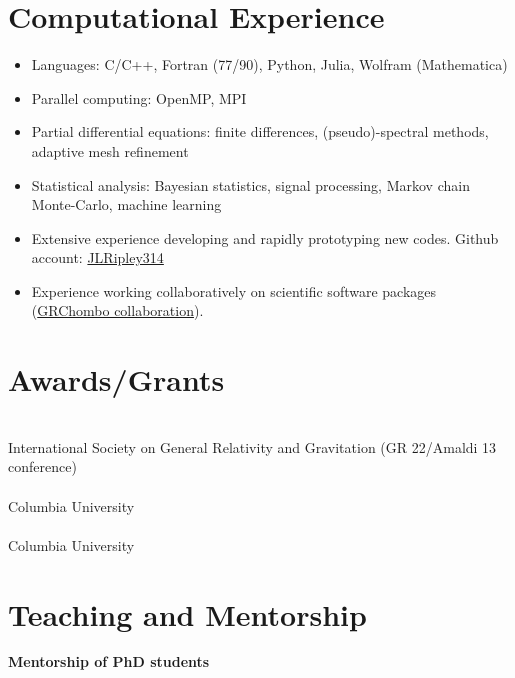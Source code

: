 \documentclass{my_cv}
\begin{document}
\section{Computational Experience}
\begin{itemize}
    \setlength\itemsep{0em}
    \item Languages: C/C++, Fortran (77/90), Python, Julia, Wolfram (Mathematica)
    \item Parallel computing: OpenMP, MPI
    \item Partial differential equations: finite differences, (pseudo)-spectral methods, adaptive mesh refinement
    \item Statistical analysis: Bayesian statistics, signal processing, Markov chain Monte-Carlo, machine learning 
    \item Extensive experience developing and rapidly prototyping new codes. 
        Github account: \href{https://github.com/JLRipley314}{JLRipley314}
    \item Experience working collaboratively on scientific software packages (\href{https://www.grchombo.org/}{GRChombo collaboration}). 
\end{itemize}
\section{Awards/Grants}
\noindent
{}
\\
International Society on General Relativity and Gravitation (GR 22/Amaldi 13 conference)
\\
\\
Columbia University
\\
\\
Columbia University
\section{Teaching and Mentorship}
{\bf Mentorship of PhD students}
\end{document}
